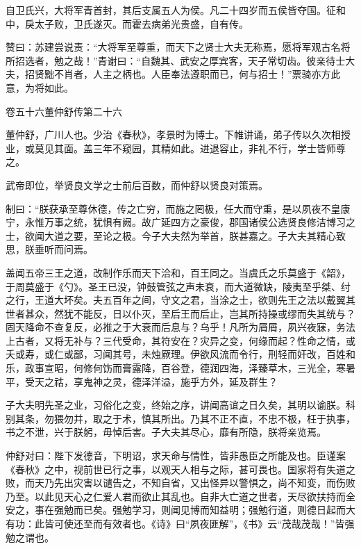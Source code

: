 \documentclass[12pt,UTF8]{ctexbook}
\begin{document}
自卫氏兴，大将军青首封，其后支属五人为侯。凡二十四岁而五侯皆夺国。征和中，戾太子败，卫氏遂灭。而霍去病弟光贵盛，自有传。



赞曰：苏建尝说责：“大将军至尊重，而天下之贤士大夫无称焉，愿将军观古名将所招选者，勉之哉！”青谢曰：“自魏其、武安之厚宾客，天子常切齿。彼亲待士大夫，招贤黜不肖者，人主之柄也。人臣奉法遵职而已，何与招士！”票骑亦方此意，为将如此。





卷五十六董仲舒传第二十六



董仲舒，广川人也。少治《春秋》，孝景时为博士。下帷讲诵，弟子传以久次相授业，或莫见其面。盖三年不窥园，其精如此。进退容止，非礼不行，学士皆师尊之。



武帝即位，举贤良文学之士前后百数，而仲舒以贤良对策焉。



制曰：“朕获承至尊休德，传之亡穷，而施之罔极，任大而守重，是以夙夜不皇康宁，永惟万事之统，犹惧有阙。故广延四方之豪俊，郡国诸侯公选贤良修洁博习之士，欲闻大道之要，至论之极。今子大夫然为举首，朕甚嘉之。子大夫其精心致思，朕垂听而问焉。



盖闻五帝三王之道，改制作乐而天下洽和，百王同之。当虞氏之乐莫盛于《韶》，于周莫盛于《勺》。圣王已没，钟鼓管弦之声未衰，而大道微缺，陵夷至乎桀、纣之行，王道大坏矣。夫五百年之间，守文之君，当涂之士，欲则先王之法以戴翼其世者甚众，然犹不能反，日以仆灭，至后王而后止，岂其所持操或缪而失其统与？固天降命不查复反，必推之于大衰而后息与？乌乎！凡所为屑屑，夙兴夜寐，务法上古者，又将无补与？三代受命，其符安在？灾异之变，何缘而起？性命之情，或夭或寿，或仁或鄙，习闻其号，未烛厥理。伊欲风流而令行，刑轻而奸改，百姓和乐，政事宣昭，何修何饬而膏露降，百谷登，德润四海，泽臻草木，三光全，寒暑平，受天之祜，享鬼神之灵，德泽洋溢，施乎方外，延及群生？



子大夫明先圣之业，习俗化之变，终始之序，讲闻高谊之日久矣，其明以谕朕。科别其条，勿猥勿并，取之于术，慎其所出。乃其不正不直，不忠不极，枉于执事，书之不泄，兴于朕躬，毋悼后害。子大夫其尽心，靡有所隐，朕将亲览焉。



仲舒对曰：陛下发德音，下明诏，求天命与情性，皆非愚臣之所能及也。臣谨案《春秋》之中，视前世已行之事，以观天人相与之际，甚可畏也。国家将有失道之败，而天乃先出灾害以谴告之，不知自省，又出怪异以警惧之，尚不知变，而伤败乃至。以此见天心之仁爱人君而欲止其乱也。自非大亡道之世者，天尽欲扶持而全安之，事在强勉而已矣。强勉学习，则闻见博而知益明；强勉行道，则德日起而大有功：此皆可使还至而有效者也。《诗》曰“夙夜匪解”，《书》云“茂哉茂哉！”皆强勉之谓也。
\end{document}
